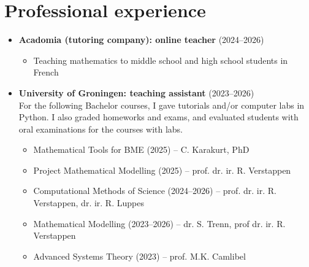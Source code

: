 \section*{Professional experience}
\begin{itemize}
\item \textbf{Acadomia (tutoring company): online teacher} (2024--2026)
\begin{itemize}
    \item Teaching mathematics to middle school and high school students in French
\end{itemize}
\item \textbf{University of Groningen: teaching assistant} (2023--2026)\\ 
    For the following Bachelor courses, I gave tutorials and/or computer labs in
    Python. I
    also graded homeworks and exams, and evaluated students
    with oral examinations for the courses with labs. \begin{itemize}
    \item Mathematical Tools for BME (2025) -- C. Karakurt, PhD
    \item Project Mathematical Modelling (2025) -- prof. dr. ir. R. Verstappen
    \item Computational Methods of Science (2024--2026) -- prof. dr. ir. R. Verstappen, dr. ir. R. Luppes
    \item Mathematical Modelling (2023--2026) -- dr. S. Trenn, prof dr. ir. R. Verstappen
    \item Advanced Systems Theory (2023) -- prof. M.K. Camlibel
\end{itemize}
\end{itemize}